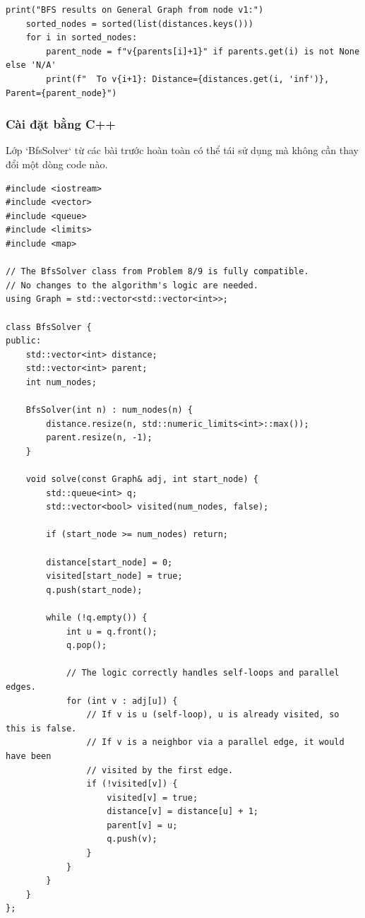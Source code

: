 \documentclass[a4paper,12pt]{article}
\begin{document}
\begin{lstlisting}[style=pythonstyle, caption={Cài đặt BFS cho đồ thị tổng quát trong Python.}, label={lst:python_bfs_10}]
    print("BFS results on General Graph from node v1:")
    sorted_nodes = sorted(list(distances.keys()))
    for i in sorted_nodes:
        parent_node = f"v{parents[i]+1}" if parents.get(i) is not None else 'N/A'
        print(f"  To v{i+1}: Distance={distances.get(i, 'inf')}, Parent={parent_node}")
\end{lstlisting}

\subsubsection{Cài đặt bằng C++}
Lớp `BfsSolver` từ các bài trước hoàn toàn có thể tái sử dụng mà không cần thay đổi một dòng code nào.
\begin{lstlisting}[style=cppstyle, caption={Cài đặt BFS cho đồ thị tổng quát trong C++.}, label={lst:cpp_bfs_10}]
#include <iostream>
#include <vector>
#include <queue>
#include <limits>
#include <map>

// The BfsSolver class from Problem 8/9 is fully compatible.
// No changes to the algorithm's logic are needed.
using Graph = std::vector<std::vector<int>>;

class BfsSolver {
public:
    std::vector<int> distance;
    std::vector<int> parent;
    int num_nodes;

    BfsSolver(int n) : num_nodes(n) {
        distance.resize(n, std::numeric_limits<int>::max());
        parent.resize(n, -1);
    }

    void solve(const Graph& adj, int start_node) {
        std::queue<int> q;
        std::vector<bool> visited(num_nodes, false);

        if (start_node >= num_nodes) return;

        distance[start_node] = 0;
        visited[start_node] = true;
        q.push(start_node);

        while (!q.empty()) {
            int u = q.front();
            q.pop();

            // The logic correctly handles self-loops and parallel edges.
            for (int v : adj[u]) {
                // If v is u (self-loop), u is already visited, so this is false.
                // If v is a neighbor via a parallel edge, it would have been
                // visited by the first edge.
                if (!visited[v]) {
                    visited[v] = true;
                    distance[v] = distance[u] + 1;
                    parent[v] = u;
                    q.push(v);
                }
            }
        }
    }
};


\end{lstlisting}
\end{document}
